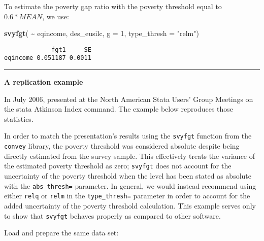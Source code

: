 \documentclass[
]{book}
\newenvironment{Shaded}{\begin{snugshade}}{\end{snugshade}}
\newcommand{\AttributeTok}[1]{\textcolor[rgb]{0.13,0.29,0.53}{#1}}
\newcommand{\DecValTok}[1]{\textcolor[rgb]{0.00,0.00,0.81}{#1}}
\newcommand{\FunctionTok}[1]{\textcolor[rgb]{0.13,0.29,0.53}{\textbf{#1}}}
\newcommand{\NormalTok}[1]{#1}
\newcommand{\SpecialCharTok}[1]{\textcolor[rgb]{0.81,0.36,0.00}{\textbf{#1}}}
\newcommand{\StringTok}[1]{\textcolor[rgb]{0.31,0.60,0.02}{#1}}
\begin{document}
To estimate the poverty gap ratio with the poverty threshold equal to \(0.6*MEAN\), we use:

\begin{Shaded}
\begin{Highlighting}[]
\FunctionTok{svyfgt}\NormalTok{( }\SpecialCharTok{\textasciitilde{}}\NormalTok{ eqincome, des\_eusilc, }\AttributeTok{g =} \DecValTok{1}\NormalTok{, }\AttributeTok{type\_thresh =} \StringTok{"relm"}\NormalTok{)}
\end{Highlighting}
\end{Shaded}

\begin{verbatim}
             fgt1     SE
eqincome 0.051187 0.0011
\end{verbatim}

\begin{center}\rule{0.5\linewidth}{0.5pt}\end{center}

\textbf{A replication example}

In July 2006, \textcite{jenkins2006} presented at the North American Stata Users' Group Meetings on the stata Atkinson Index command. The example below reproduces those statistics.

In order to match the presentation's results using the \texttt{svyfgt} function from the \texttt{convey} library, the poverty threshold was considered absolute despite being directly estimated from the survey sample. This effectively treats the variance of the estimated poverty threshold as zero; \texttt{svyfgt} does not account for the uncertainty of the poverty threshold when the level has been stated as absolute with the \texttt{abs\_thresh=} parameter. In general, we would instead recommend using either \texttt{relq} or \texttt{relm} in the \texttt{type\_thresh=} parameter in order to account for the added uncertainty of the poverty threshold calculation. This example serves only to show that \texttt{svyfgt} behaves properly as compared to other software.

Load and prepare the same data set:
\end{document}
